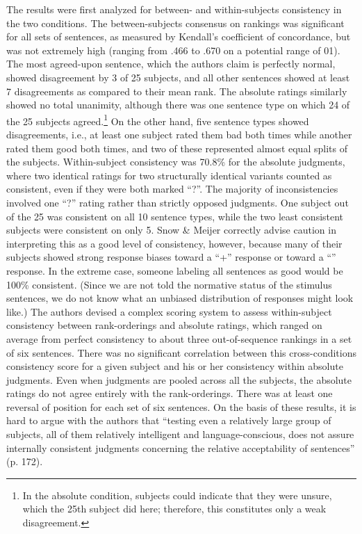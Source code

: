 The results were first analyzed for between- and within-subjects consistency in the two conditions. The between-subjects consensus on rankings was significant for all sets of sentences, as measured by Kendall's coefficient of concordance, but was not extremely high (ranging from .466 to .670 on a potential range of 0\textendash{}1). The most agreed-upon sentence, which the authors claim is perfectly normal, showed disagreement by 3 of 25 subjects, and all other sentences showed at least 7 disagreements as compared to their mean rank. The absolute ratings similarly showed no total unanimity, although there was one sentence type on which 24 of the 25 subjects agreed.\footnote{In the absolute condition, subjects could indicate that they were unsure, which the 25th subject did here; therefore, this constitutes only a weak disagreement.}
 On the other hand, five sentence types showed disagreements, i.e., at least one subject rated them bad both times while another rated them good both times, and two of these represented almost equal splits of the subjects. Within-subject consistency was 70.8\% for the absolute judgments, where two identical ratings for two structurally identical variants counted as consistent, even if they were both marked ``?''. The majority of inconsistencies involved one ``?'' rating rather than strictly opposed judgments. One subject out of the 25 was consistent on all 10 sentence types, while the two least consistent subjects were consistent on only 5. Snow \& Meijer correctly advise caution in interpreting this as a good level of consistency, however, because many of their
subjects showed strong response biases toward a ``+'' response or toward a ``\textminus''
response. In the extreme case, someone labeling all sentences as good would be 100\% consistent. (Since we are not told the normative status of the stimulus sentences, we do not know what an unbiased distribution of responses might look like.) The authors devised a complex scoring system to assess within-subject consistency between rank-orderings and absolute ratings, which ranged on average from perfect consistency to about three out-of-sequence rankings in a set of six sentences. There was no significant correlation between this cross-conditions consistency score for a given subject and his or her consistency within absolute judgments. Even when judgments are pooled across all the subjects, the absolute ratings do not agree entirely with the rank-orderings. There was at least one reversal
of position for each set of six sentences. On the basis of these results, it is hard to
argue with the authors that ``testing even a relatively large group of subjects, all of
them relatively intelligent and language-conscious, does not assure internally consistent judgments concerning the relative acceptability of sentences'' (p. 172). 

